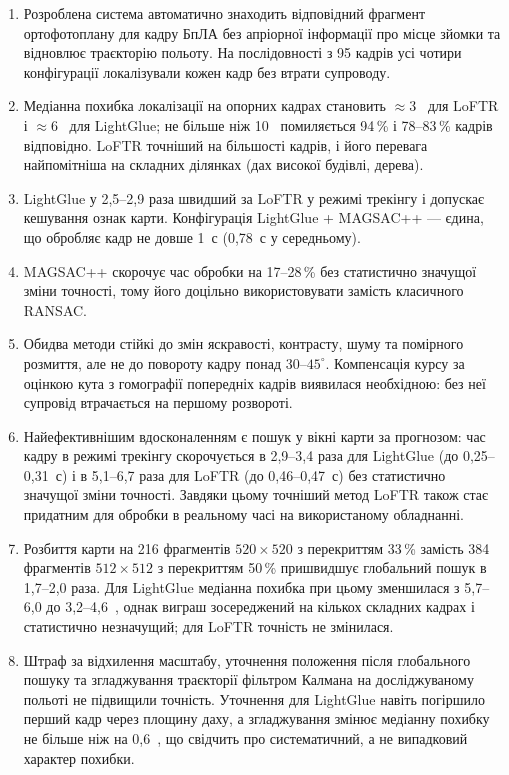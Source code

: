 \documentclass[a4paper, 12pt, titlepage]{article}
\begin{document}
\begin{enumerate}
    \item Розроблена система автоматично знаходить відповідний фрагмент ортофотоплану для кадру БпЛА без апріорної інформації про місце зйомки та відновлює траєкторію польоту. На послідовності з 95 кадрів усі чотири конфігурації локалізували кожен кадр без втрати супроводу.
    \item Медіанна похибка локалізації на опорних кадрах становить $\approx 3$~\px{} для LoFTR і $\approx 6$~\px{} для LightGlue; не більше ніж 10~\px{} помиляється 94\,\% і 78--83\,\% кадрів відповідно. LoFTR точніший на більшості кадрів, і його перевага найпомітніша на складних ділянках (дах високої будівлі, дерева).
    \item LightGlue у 2,5--2,9 раза швидший за LoFTR у режимі трекінгу і допускає кешування ознак карти. Конфігурація LightGlue + MAGSAC++ --- єдина, що обробляє кадр не довше 1~с (0,78~с у середньому).
    \item MAGSAC++ скорочує час обробки на 17--28\,\% без статистично значущої зміни точності, тому його доцільно використовувати замість класичного RANSAC.
    \item Обидва методи стійкі до змін яскравості, контрасту, шуму та помірного розмиття, але не до повороту кадру понад $30$--$45^\circ$. Компенсація курсу за оцінкою кута з гомографії попередніх кадрів виявилася необхідною: без неї супровід втрачається на першому розвороті.
    \item Найефективнішим вдосконаленням є пошук у вікні карти за прогнозом: час кадру в режимі трекінгу скорочується в 2,9--3,4 раза для LightGlue (до 0,25--0,31~с) і в 5,1--6,7 раза для LoFTR (до 0,46--0,47~с) без статистично значущої зміни точності. Завдяки цьому точніший метод LoFTR також стає придатним для обробки в реальному часі на використаному обладнанні.
    \item Розбиття карти на 216 фрагментів $520 \times 520$ з перекриттям 33\,\% замість 384 фрагментів $512 \times 512$ з перекриттям 50\,\% пришвидшує глобальний пошук в 1,7--2,0 раза. Для LightGlue медіанна похибка при цьому зменшилася з 5,7--6,0 до 3,2--4,6~\px{}, однак виграш зосереджений на кількох складних кадрах і статистично незначущий; для LoFTR точність не змінилася.
    \item Штраф за відхилення масштабу, уточнення положення після глобального пошуку та згладжування траєкторії фільтром Калмана на досліджуваному польоті не підвищили точність. Уточнення для LightGlue навіть погіршило перший кадр через площину даху, а згладжування змінює медіанну похибку не більше ніж на 0,6~\px{}, що свідчить про систематичний, а не випадковий характер похибки.

\end{enumerate}
\end{document}
